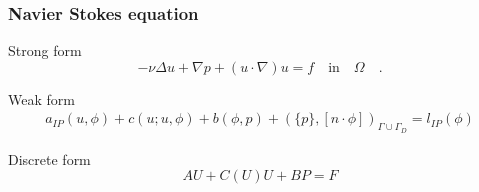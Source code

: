 \documentclass{beamer}
\begin{document}

\begin{frame}
\frametitle{Navier Stokes equation}

\begin{block}{Strong form}
\begin{equation} \label{navier_stokes_strong_ch3}
-\nu \Delta u + \nabla p + (u \cdot \nabla) u = f \quad \textrm{in} \quad \Omega \quad \textrm{.}
\end{equation}
\end{block}

\begin{block}{Weak form}
\begin{equation}\label{navier_stokes_weak_ch3}
\begin{split}
a_{IP}(u,\phi) + c(u;u,\phi) + b(\phi,p) + (\{p\},[n\cdot \phi])_{\Gamma \cup \Gamma_D} = l_{IP}(\phi) 
\end{split}
\end{equation}
\end{block}

\begin{block}{Discrete form}
\begin{equation}
AU + C(U) U + BP = F
\end{equation} 
\end{block}

\end{frame}

\end{document}
